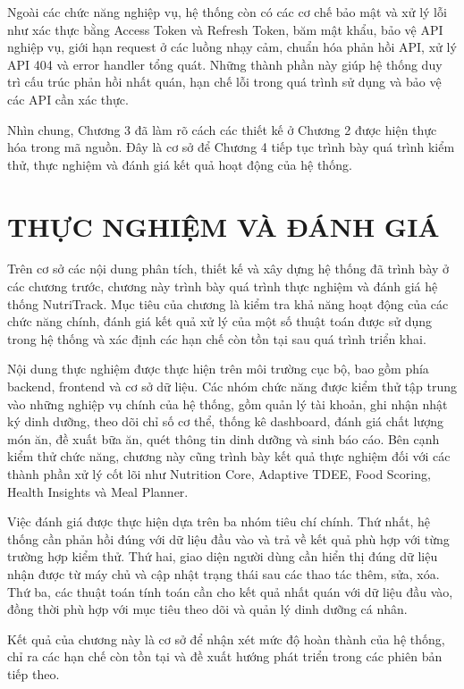 \documentclass[12pt, a4paper]{report}
\begin{document}
Ngoài các chức năng nghiệp vụ, hệ thống còn có các cơ chế bảo mật và xử lý lỗi như xác thực bằng Access Token và Refresh Token, băm mật khẩu, bảo vệ API nghiệp vụ, giới hạn request ở các luồng nhạy cảm, chuẩn hóa phản hồi API, xử lý API 404 và error handler tổng quát. Những thành phần này giúp hệ thống duy trì cấu trúc phản hồi nhất quán, hạn chế lỗi trong quá trình sử dụng và bảo vệ các API cần xác thực.

Nhìn chung, Chương 3 đã làm rõ cách các thiết kế ở Chương 2 được hiện thực hóa trong mã nguồn. Đây là cơ sở để Chương 4 tiếp tục trình bày quá trình kiểm thử, thực nghiệm và đánh giá kết quả hoạt động của hệ thống.




\chapter{THỰC NGHIỆM VÀ ĐÁNH GIÁ}
Trên cơ sở các nội dung phân tích, thiết kế và xây dựng hệ thống đã trình bày ở các chương trước, chương này trình bày quá trình thực nghiệm và đánh giá hệ thống NutriTrack. Mục tiêu của chương là kiểm tra khả năng hoạt động của các chức năng chính, đánh giá kết quả xử lý của một số thuật toán được sử dụng trong hệ thống và xác định các hạn chế còn tồn tại sau quá trình triển khai.

Nội dung thực nghiệm được thực hiện trên môi trường cục bộ, bao gồm phía backend, frontend và cơ sở dữ liệu. Các nhóm chức năng được kiểm thử tập trung vào những nghiệp vụ chính của hệ thống, gồm quản lý tài khoản, ghi nhận nhật ký dinh dưỡng, theo dõi chỉ số cơ thể, thống kê dashboard, đánh giá chất lượng món ăn, đề xuất bữa ăn, quét thông tin dinh dưỡng và sinh báo cáo. Bên cạnh kiểm thử chức năng, chương này cũng trình bày kết quả thực nghiệm đối với các thành phần xử lý cốt lõi như Nutrition Core, Adaptive TDEE, Food Scoring, Health Insights và Meal Planner.

Việc đánh giá được thực hiện dựa trên ba nhóm tiêu chí chính. Thứ nhất, hệ thống cần phản hồi đúng với dữ liệu đầu vào và trả về kết quả phù hợp với từng trường hợp kiểm thử. Thứ hai, giao diện người dùng cần hiển thị đúng dữ liệu nhận được từ máy chủ và cập nhật trạng thái sau các thao tác thêm, sửa, xóa. Thứ ba, các thuật toán tính toán cần cho kết quả nhất quán với dữ liệu đầu vào, đồng thời phù hợp với mục tiêu theo dõi và quản lý dinh dưỡng cá nhân.

Kết quả của chương này là cơ sở để nhận xét mức độ hoàn thành của hệ thống, chỉ ra các hạn chế còn tồn tại và đề xuất hướng phát triển trong các phiên bản tiếp theo.
\end{document}

